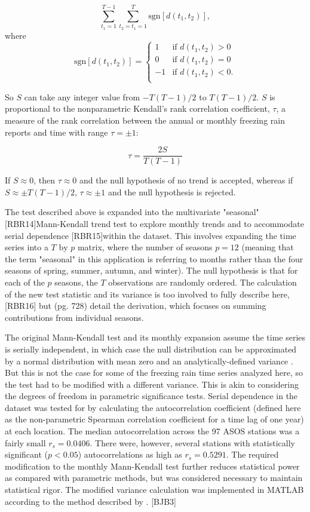 \documentclass[twocol]{ametsoc}
\begin{document}
\[\sum_{t_1=1}^{T-1}\sum_{t_2=t_1=1}^T\text{sgn}[d(t_1,t_2)],\] where\\
\[\text{sgn}[d(t_1,t_2)]=\begin{cases} 1 & \text{if } d(t_1,t_2)>0\\ 0 & \text{if } d(t_1,t_2)=0\\ -1 & \text{if } d(t_1,t_2)<0.\\ \end{cases}\]

So $S$ can take any integer value from $-T(T-1)/2$ to $T(T-1)/2$. $S$ is proportional to the nonparametric Kendall's rank correlation coefficient, $\tau$, a measure of the rank correlation between the annual or monthly freezing rain reports and time with range $\tau=\pm1$:

\[\tau=\frac{2S}{T(T-1)}\]

If $S\approx0$, then $\tau\approx0$ and the null hypothesis of no trend is accepted, whereas if  $S\approx\pm T(T-1)/2$, $\tau\approx\pm1$ and the null hypothesis is rejected. 

The test described above is expanded into the multivariate "seasonal" [RBR14]Mann-Kendall trend test to explore monthly trends and to accommodate serial dependence [RBR15]within the dataset. This involves expanding the time series into a $T\text{ by }p$ matrix, where the number of seasons $p=12$ (meaning that the term "seasonal" in this application is referring to months rather than the four seasons of spring, summer, autumn, and winter). The null hypothesis is that for each of the $p$ seasons, the $T$ observations are randomly ordered. The calculation of the new test statistic and its variance is too involved to fully describe here,[RBR16] but \citet{hirsch1984nonparametric} (pg. 728) detail the derivation, which focuses on summing contributions from individual seasons.

The original Mann-Kendall test and its monthly expansion assume the time series is serially independent, in which case the null distribution can be approximated by a normal distribution with mean zero and an analytically-defined variance \citep{kendall1955rank}. But this is not the case for some of the freezing rain time series analyzed here, so the test had to be modified with a different variance. This is akin to considering the degrees of freedom in parametric significance tests. Serial dependence in the dataset was tested for by calculating the autocorrelation coefficient (defined here as the non-parametric Spearman correlation coefficient for a time lag of one year) at each location. The median autocorrelation across the 97 ASOS stations was a fairly small $r_s = 0.0406$.  There were, however, several stations with statistically significant ($p<0.05$) autocorrelations as high as $r_s = 0.5291$. The required modification to the monthly Mann-Kendall test further reduces statistical power as compared with parametric methods, but was considered necessary to maintain statistical rigor. The modified variance calculation was implemented in MATLAB according to the method described by \citet{hirsch1984nonparametric}. [BJB3]
\end{document}
